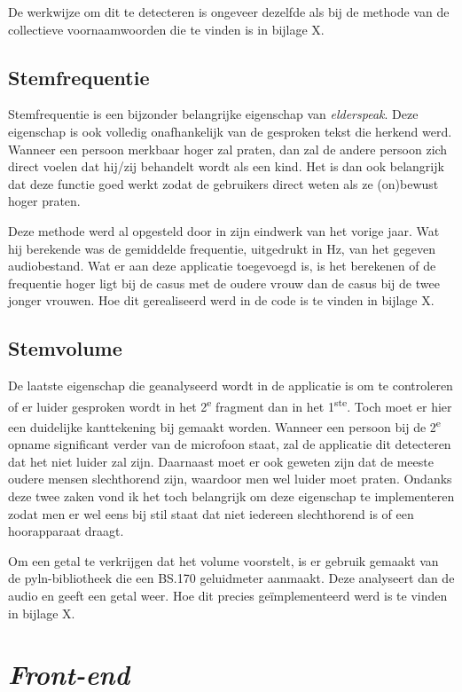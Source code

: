 De werkwijze om dit te detecteren is ongeveer dezelfde als bij de methode van de collectieve voornaamwoorden die te vinden is in bijlage X.

\subsection{Stemfrequentie}
Stemfrequentie is een bijzonder belangrijke eigenschap van \textit{elderspeak}. Deze eigenschap is ook volledig onafhankelijk van de gesproken tekst die herkend werd. Wanneer een persoon merkbaar hoger zal praten, dan zal de andere persoon zich direct voelen dat hij/zij behandelt wordt als een kind. Het is dan ook belangrijk dat deze functie goed werkt zodat de gebruikers direct weten als ze (on)bewust hoger praten.

Deze methode werd al opgesteld door \textcite{Standaert2021} in zijn eindwerk van het vorige jaar. Wat hij berekende was de gemiddelde frequentie, uitgedrukt in Hz, van het gegeven audiobestand. Wat er aan deze applicatie toegevoegd is, is het berekenen of de frequentie hoger ligt bij de casus met de oudere vrouw dan de casus bij de twee jonger vrouwen.
Hoe dit gerealiseerd werd in de code is te vinden in bijlage X.

\subsection{Stemvolume}
De laatste eigenschap die geanalyseerd wordt in de applicatie is om te controleren of er luider gesproken wordt in het 2\textsuperscript{e} fragment dan in het 1\textsuperscript{ste}. Toch moet er hier een duidelijke kanttekening bij gemaakt worden. Wanneer een persoon bij de 2\textsuperscript{e} opname significant verder van de microfoon staat, zal de applicatie dit detecteren dat het niet luider zal zijn. Daarnaast moet er ook geweten zijn dat de meeste oudere mensen slechthorend zijn, waardoor men wel luider moet praten. Ondanks deze twee zaken vond ik het toch belangrijk om deze eigenschap te implementeren zodat men er wel eens bij stil staat dat niet iedereen slechthorend is of een hoorapparaat draagt.

Om een getal te verkrijgen dat het volume voorstelt, is er gebruik gemaakt van de pyln-bibliotheek die een BS.170 geluidmeter aanmaakt. Deze analyseert dan de audio en geeft een getal weer. Hoe dit precies geïmplementeerd werd is te vinden in bijlage X.


\section{\textit{Front-end}}
